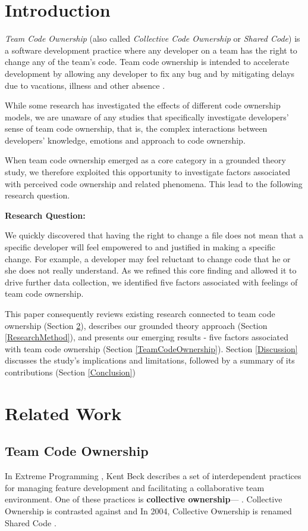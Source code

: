 \section{Introduction}
\textit{Team Code Ownership} (also called \textit{Collective Code Ownership} or \textit{Shared Code}) is a software development practice where any developer on a team has the right to change any of the team's code. Team code ownership is intended to accelerate development by allowing any developer to fix any bug and by mitigating delays due to vacations, illness and other absence \cite{ExtremeProgramming2004}.
 
While some research has investigated the effects of different code ownership models, we are unaware of any studies that specifically investigate developers' sense of team code ownership, that is, the complex interactions between developers' knowledge, emotions and approach to code ownership.  

When team code ownership emerged as a core category in a grounded theory study, we therefore exploited this opportunity to investigate factors associated with perceived code ownership and related phenomena. This lead to the following research question. 

\textbf{Research Question:} 

We quickly discovered that having the right to change a file does not mean that a specific developer will feel empowered to and justified in making a specific change. For example, a developer may feel reluctant to change code that he or she does not really understand. As we refined this core finding and allowed it to drive further data collection, we identified five factors associated with feelings of team code ownership. 

This paper consequently reviews existing research connected to team code ownership (Section \ref{RelatedWork}), describes our grounded theory approach (Section \ref{ResearchMethod}), and presents our emerging results - five factors associated with team code ownership (Section \ref{TeamCodeOwnership}). Section \ref{Discussion} discusses the study's implications and limitations, followed by a summary of its contributions (Section \ref{Conclusion})
\section{Related Work}
\label{RelatedWork}

\subsection{Team Code Ownership}
In Extreme Programming \cite{ExtremeProgramming2004}, Kent Beck describes a set of interdependent practices for managing feature development and facilitating a collaborative team environment. One of these practices is \textbf{collective ownership}--- \cite{ExtremeProgramming2000}. Collective Ownership is contrasted against  and  In 2004, Collective Ownership is renamed Shared Code \cite{ExtremeProgramming2004}.

